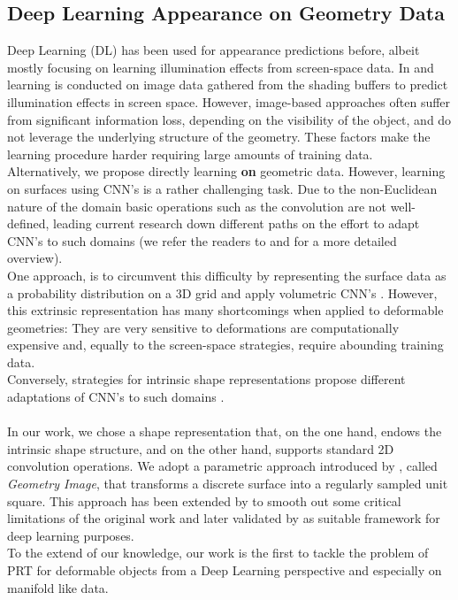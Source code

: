 \subsection*{Deep Learning Appearance on Geometry Data} 
Deep Learning (DL) has been used for appearance predictions before, albeit mostly focusing on learning illumination effects from screen-space data. In  \cite{Nalbach2017b} and \cite{DBLP} learning is conducted on image data gathered from the shading buffers to predict illumination effects in screen space. However, image-based approaches often suffer from significant information loss, depending on the visibility of the object, and do not leverage the underlying structure of the geometry. These factors make the learning procedure harder requiring large amounts of training data.
\\
Alternatively, we propose directly learning \textbf{on} geometric data.  However, learning on surfaces using CNN's is a rather challenging task. Due to the non-Euclidean nature of the domain basic operations such as the convolution are not well-defined, leading current research down different paths on the effort to adapt CNN's to such domains (we refer the readers to \cite{Geometric_deep_learning} and \cite{DeepGeoCourse} for a more detailed overview).
\\
One approach, is to circumvent this difficulty by representing the surface data as a probability distribution on a  3D grid and apply volumetric CNN's \cite{3d_ShapeNets}. However, this extrinsic representation has many shortcomings when applied to deformable geometries: They are very sensitive to deformations are computationally expensive and, equally to the screen-space strategies, require abounding training data.
\\
Conversely, strategies for intrinsic shape representations propose different adaptations of CNN's to such domains \cite{ShapeNet1, BoscainiMRB16, CNN_on_Torus}.
\\
\\ 
In our work, we chose a shape representation that, on the one hand, endows the intrinsic shape structure, and on the other hand, supports standard 2D convolution operations. We adopt a parametric approach introduced by \cite{gu2002geometry}, called \textit{Geometry Image}, that transforms a discrete surface into a regularly sampled unit square. This approach has been extended by \cite{Spherical_Parametrization} to smooth out some critical limitations of the original work and later validated by \cite{sinha2016deep} as suitable framework for deep learning purposes.
\\
To the extend of our knowledge, our work is the first to tackle the problem of PRT for deformable objects from a Deep Learning perspective and especially on manifold like data. 


